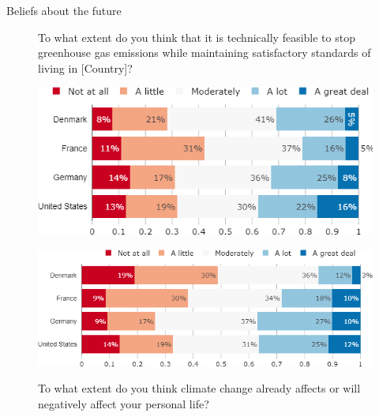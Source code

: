 \documentclass[aspectratio=169,9pt,dvipsnames]{beamer}
\begin{document}
\begin{frame}{Beliefs about the future}%
\begin{figure}[h!]
\caption{To what extent do you think that it is technically feasible to stop greenhouse gas emissions while maintaining satisfactory standards of living in [Country]?}
\includegraphics[width=.6\textwidth]{../figures/country_comparison/net_zero_feasible_countries.png} \\
\caption{To what extent do you think climate change already affects or will negatively affect your personal life?}
\includegraphics[width=.6\textwidth]{../figures/country_comparison/CC_affects_self_countries.png} \\
\end{figure}
\end{frame}
\end{document}
